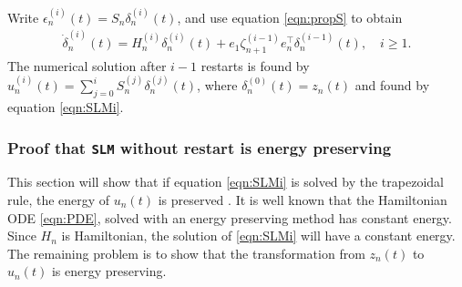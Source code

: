 \noindent Write $ \epsilon^{(i)}_n(t)  = S_n \delta_n^{(i)}(t) $, and use equation \eqref{eqn:propS} to obtain
\begin{equation}
\begin{aligned}
\dot{\delta}_n^{(i)}(t) = H_n^{(i)} \delta_n^{(i)}(t) + e_1 \zeta_{n+1}^{(i-1)} e_n^\top \delta_n^{(i-1)}(t), \quad i \geq 1.
\label{eqn:SLMr}
\end{aligned}
\end{equation}
\noindent The numerical solution after $i-1$ restarts is found by $ u_n^{(i)}(t) = \sum \limits_{j = 0} ^i S_n^{(j)} \delta_n^{(j)} (t) $, where $\delta_n^{(0)} (t) = z_n(t)$ and found by equation \eqref{eqn:SLMi}.\\


\subsubsection{Proof that \texttt{SLM} without restart is energy preserving} %
This section will show that if equation \eqref{eqn:SLMi} is solved by the trapezoidal rule, the energy of $u_n(t)$ is preserved \cite{SLMpreserve}. It is well known that the Hamiltonian ODE \eqref{eqn:PDE}, solved with an energy preserving method has constant energy. Since $H_n$ is Hamiltonian, the solution of \eqref{eqn:SLMi} will have a constant energy. The remaining problem is to show that the transformation from $z_n(t)$ to $u_n(t)$ is energy preserving.\\


